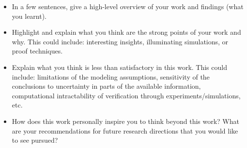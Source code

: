 \documentclass[article,11pt,onecolumn,final]{IEEEtran}
\begin{document}
\begin{itemize}

\item In a few sentences, give a high-level overview of your work and findings (what you learnt).

\item Highlight and explain what you think are the
strong points of your work and why. This could include: interesting
insights, illuminating simulations, or proof
techniques.

\item Explain what you think is less than
satisfactory in this work. This could include: limitations of the
modeling assumptions, sensitivity of the conclusions to uncertainty in
parts of the available information, computational intractability of
verification through experiments/simulations, etc.

\item How does this work personally
inspire you to think beyond this work? What are your recommendations
for future research directions that you would like to see pursued?

\end{itemize}
\end{document}
